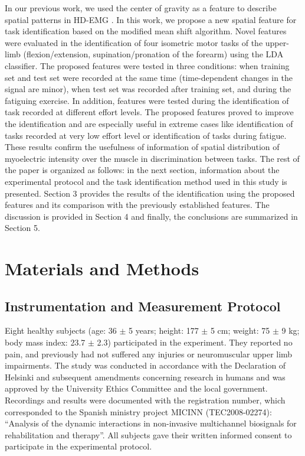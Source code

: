 In our previous work, we used the center of gravity as a feature to describe spatial patterns in HD-EMG \citep{Jordanic2016a, Jordanic2016b, Rojas-Martinez2013}. In this work, we propose a new spatial feature for task identification based on the modified mean shift algorithm. Novel features were evaluated in the identification of four isometric motor tasks of the upper-limb (flexion/extension, supination/pronation of the forearm) using the LDA classifier. The proposed features were tested in three conditions: when training set and test set were recorded at the same time (time-dependent changes in the signal are minor), when test set was recorded after training set, and during the fatiguing exercise. In addition, features were tested during the identification of task recorded at different effort levels. The proposed features proved to improve the identification and are especially useful in extreme cases like identification of tasks recorded at very low effort level or identification of tasks during fatigue. These results confirm the usefulness of information of spatial distribution of myoelectric intensity over the muscle in discrimination between tasks.
The rest of the paper is organized as follows: in the next section, information about the experimental protocol and the task identification method used in this study is presented. Section 3 provides the results of the identification using the proposed features and its comparison with the previously established features. The discussion is provided in Section 4 and finally, the conclusions are summarized in Section 5.\\
\clearpage

\section{Materials and Methods}

\subsection{Instrumentation and Measurement Protocol}

Eight healthy subjects (age: 36 $\pm$ 5 years; height: 177 $\pm$ 5 cm; weight: 75 $\pm$ 9 kg; body mass index: 23.7 $\pm$ 2.3) participated in the experiment. They reported no pain, and previously had not suffered any injuries or neuromuscular upper limb impairments. The study was conducted in accordance with the Declaration of Helsinki and subsequent amendments concerning research in humans and was approved by the University Ethics Committee and the local government. Recordings and results were documented with the registration number, which corresponded to the Spanish ministry project MICINN (TEC2008-02274): “Analysis of the dynamic interactions in non-invasive multichannel biosignals for rehabilitation and therapy”. All subjects gave their written informed consent to participate in the experimental protocol.

